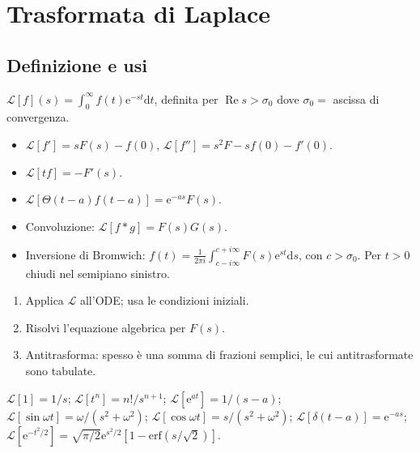 \documentclass[11pt,a4paper,openany]{book}
\theoremstyle{definition}
\newcommand{\Lap}{\mathcal{L}}
\newcommand{\dd}{\mathrm{d}}
\newcommand{\eu}{\mathrm{e}}
\renewcommand{\Re}{\operatorname{Re}}
\begin{document}
\chapter{Trasformata di Laplace}

\section{Definizione e usi}
$\Lap[f](s)=\int_0^\infty f(t)\eu^{-st}\dd t$, definita per $\Re s>\sigma_0$ dove $\sigma_0=$ ascissa di convergenza.

\begin{teoria}[Propriet\`a]
\begin{itemize}
\item $\Lap[f']=s F(s)-f(0)$, $\Lap[f'']=s^2F-sf(0)-f'(0)$.
\item $\Lap[tf]=-F'(s)$.
\item $\Lap[\Theta(t-a)f(t-a)]=\eu^{-as}F(s)$.
\item Convoluzione: $\Lap[f*g]=F(s)G(s)$.
\item Inversione di Bromwich: $f(t)=\frac{1}{2\pi i}\int_{c-i\infty}^{c+i\infty}F(s)\eu^{st}\dd s$, con $c>\sigma_0$. Per $t>0$ chiudi nel semipiano sinistro.
\end{itemize}
\end{teoria}

\begin{algoritmo}
\begin{enumerate}
\item Applica $\Lap$ all'ODE; usa le condizioni iniziali.
\item Risolvi l'equazione algebrica per $F(s)$.
\item Antitrasforma: spesso \`e una somma di frazioni semplici, le cui antitrasformate sono tabulate.
\end{enumerate}
\end{algoritmo}

\begin{formulario}
$\Lap[1]=1/s$; $\Lap[t^n]=n!/s^{n+1}$; $\Lap[\eu^{at}]=1/(s-a)$; $\Lap[\sin\omega t]=\omega/(s^2+\omega^2)$; $\Lap[\cos\omega t]=s/(s^2+\omega^2)$; $\Lap[\delta(t-a)]=\eu^{-as}$; $\Lap[\eu^{-t^2/2}]=\sqrt{\pi/2}\eu^{s^2/2}[1-\mathrm{erf}(s/\sqrt 2)]$.
\end{formulario}

\end{document}
